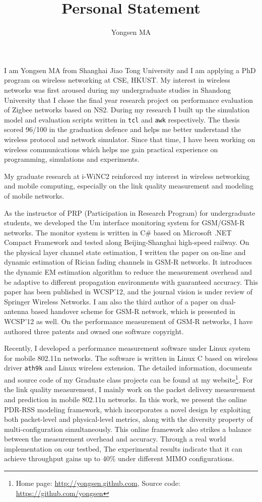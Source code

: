 \documentclass[journal,onecolumn]{IEEEtran}
\title{Personal Statement}
\author{Yongsen MA}
\begin{document}
\maketitle%
I am Yongsen MA from Shanghai Jiao Tong University and I am applying a PhD program on wireless networking at CSE, HKUST. My interest in wireless networks was first aroused during my undergraduate studies in Shandong University that I chose the final year research project on performance evaluation of Zigbee networks based on NS2. During my research I built up the simulation model and evaluation scripts written in \verb"tcl" and \verb"awk" respectively. The thesis scored 96/100 in the graduation defence and helps me better understand the wireless protocol and network simulator. Since that time, I have been working on wireless communications which helps me gain practical experience on programming, simulations and experiments.


My graduate research at i-WiNC2 reinforced my interest in wireless networking and mobile computing, especially on the link quality measurement and modeling of mobile networks. 

As the instructor of PRP (Participation in Research Program) for undergraduate students, we developed the Um interface monitoring system for GSM/GSM-R networks. The monitor system is written in C\# based on Microsoft .NET Compact Framework and tested along Beijing-Shanghai high-speed railway. On the physical layer channel state estimation, I written the paper on on-line and dynamic estimation of Rician fading channels in GSM-R networks. It introduces the dynamic EM estimation algorithm to reduce the measurement overhead and be adaptive to different propagation environments with guaranteed accuracy. This paper has been published in WCSP'12, and the journal vision is under review of Springer Wireless Networks. I am also the third author of a paper on dual-antenna based handover scheme for GSM-R network, which is presented in WCSP'12 as well. On the performance measurement of GSM-R networks, I have authored three patents and owned one software copyright.

Recently, I developed a performance measurement software under Linux system for mobile 802.11n networks. The software is written in Linux C based on wireless driver \texttt{ath9k} and Linux wireless extension. The detailed information, documents and source code of my Graduate class projects can be found at my website\footnote{Home page: \url{http://yongsen.github.com}, Source code: \url{https://github.com/yongsen}}. For the link quality measurement, I mainly work on the packet delivery measurement and prediction in mobile 802.11n networks. In this work, we present the online PDR-RSS modeling framework, which incorporates a novel design by exploiting both packet-level and physical-level metrics, along with the diversity property of multi-configuration simultaneously. This online framework also strikes a balance between the measurement overhead and accuracy. Through a real world implementation on our testbed, The experimental results indicate that it can achieve throughput gains up to 40\% under different MIMO configurations.
\end{document}
